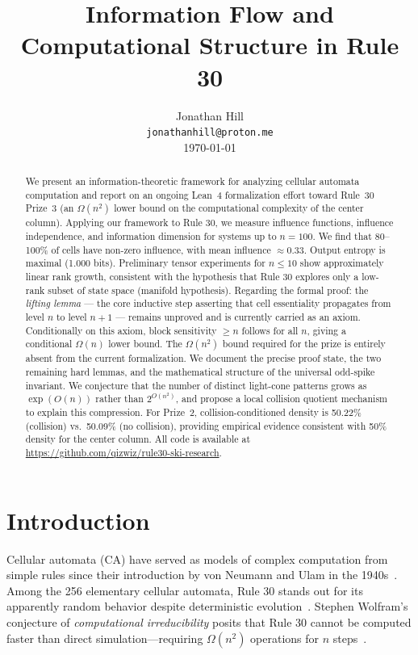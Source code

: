 \documentclass[11pt]{article}
\title{Information Flow and Computational Structure in Rule 30}
\author{
    Jonathan Hill \\
    \texttt{jonathanhill@proton.me} \\
    \today
}
\date{}
\begin{document}
\maketitle

\begin{abstract}
We present an information-theoretic framework for analyzing cellular automata computation and report on an ongoing Lean~4 formalization effort toward Rule~30 Prize~3 (an $\Omega(n^2)$ lower bound on the computational complexity of the center column). Applying our framework to Rule 30, we measure influence functions, influence independence, and information dimension for systems up to $n=100$. We find that 80--100\% of cells have non-zero influence, with mean influence $\approx 0.33$. Output entropy is maximal (1.000 bits). Preliminary tensor experiments for $n \leq 10$ show approximately linear rank growth, consistent with the hypothesis that Rule 30 explores only a low-rank subset of state space (manifold hypothesis). Regarding the formal proof: the \emph{lifting lemma} --- the core inductive step asserting that cell essentiality propagates from level $n$ to level $n+1$ --- remains unproved and is currently carried as an axiom. Conditionally on this axiom, block sensitivity $\geq n$ follows for all $n$, giving a conditional $\Omega(n)$ lower bound. The $\Omega(n^2)$ bound required for the prize is entirely absent from the current formalization. We document the precise proof state, the two remaining hard lemmas, and the mathematical structure of the universal odd-spike invariant. We conjecture that the number of distinct light-cone patterns grows as $\exp(O(n))$ rather than $2^{O(n^2)}$, and propose a local collision quotient mechanism to explain this compression. For Prize~2, collision-conditioned density is 50.22\% (collision) vs.\ 50.09\% (no collision), providing empirical evidence consistent with 50\% density for the center column. All code is available at \url{https://github.com/qizwiz/rule30-ski-research}.
\end{abstract}

\section{Introduction}

Cellular automata (CA) have served as models of complex computation from simple rules since their introduction by von Neumann and Ulam in the 1940s~\citep{von_neumann_1966}. Among the 256 elementary cellular automata, Rule 30 stands out for its apparently random behavior despite deterministic evolution~\citep{wolfram_1983}. Stephen Wolfram's conjecture of \emph{computational irreducibility} posits that Rule 30 cannot be computed faster than direct simulation---requiring $\Omega(n^2)$ operations for $n$ steps~\citep{wolfram_2002}.
\end{document}
